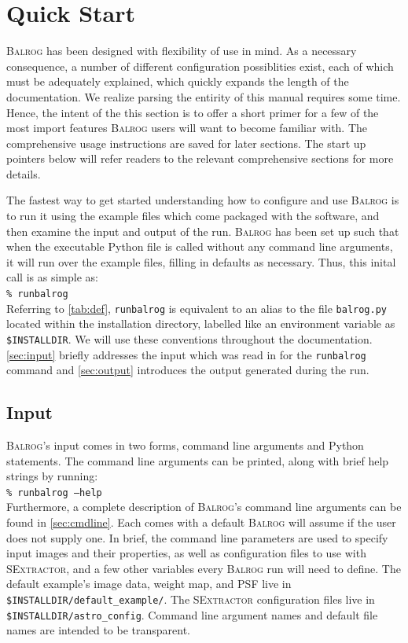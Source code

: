 \documentclass[12pt]{book}
\newcommand{\py}{Python}
\newcommand{\balrog}{\textsc{Balrog}}
\newcommand{\sex}{\textsc{SExtractor}}
\newcommand{\opt}[1]{\texttt{--#1}}
\newcommand{\inline}{\\[0.4cm]}
\newcommand{\bcmd}[1]{\texttt{\% runbalrog #1}}
\begin{document}
\chapter{Quick Start}
\label{sec:quick}

\balrog{} has been designed with flexibility of use in mind. As a necessary consequence, 
a number of different configuration possiblities exist, each of which must be
adequately explained, which quickly expands the length of the documentation.
We realize parsing the entirity of this manual requires some time.
Hence, the intent of the this section is to offer a short primer for a few of the most import features
\balrog{} users will want to become familiar with.
The comprehensive usage instructions are saved for later sections.
The start up pointers below will refer readers to the relevant comprehensive sections for more details.

The fastest way to get started understanding how to configure and use \balrog{} is to
run it using the example files which come packaged with the software, and then examine the input
and output of the run. 
\balrog{} has been set up such that when the executable \py{}
file is called without any command line arguments, it will run over
the example files, filling in defaults as necessary. 
Thus, this inital call is as simple as:
\inline
\bcmd{}
\inline
Referring to \autoref{tab:def}, \texttt{runbalrog} is equivalent to an alias to the file
\texttt{balrog.py} located within the installation directory, labelled like an environment variable as \texttt{\$INSTALLDIR}. We will use these conventions
throughout the documentation. \autoref{sec:input} briefly addresses
the input which was read in for the \texttt{runbalrog} command and \autoref{sec:output} introduces the output
generated during the run.

\section{Input}
\label{sec:input}

\balrog{}'s input comes in two forms, command line arguments and \py{} statements.
The command line arguments can be printed, along with brief help strings by running:
\inline
\bcmd{\opt{help}}
\inline
Furthermore, a complete description of \balrog{}'s command line arguments can be found in \autoref{sec:cmdline}.
Each comes with a default \balrog{} will assume if the user does not supply one.
In brief, the command line parameters are used to specify input images and their properties, as well as configuration
files to use with \sex{}, and a few other variables every \balrog{} run will need to define. 
The default example's image data, weight map, and PSF live in \texttt{\$INSTALLDIR/default\_example/}.
The \sex{} configuration files live in \texttt{\$INSTALLDIR/astro\_config}. 
Command line argument names and default file names are intended to be transparent.
\end{document}
